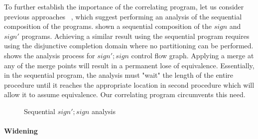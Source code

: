 To further establish the importance of the correlating program, let us consider previous approaches ~\cite{}, which suggest performing an analysis of the sequential composition of the programs.  shown a sequential composition of the $sign$ and $sign'$ programs. Achieving a similar result using the sequential program requires using the disjunctive completion domain where no partitioning can be performed.  shows the analysis process for $sign';sign$ control flow graph. Applying a merge at any of the merge points will result in a permanent lose of equivalence. Essentially, in the sequential program, the analysis must "wait" the length of the entire procedure until it reaches the appropriate location in second procedure which will allow it to assume equivalence. Our correlating program circumvents this need.



\begin{figure}
\caption{Sequential $sign';sign$ analysis}
\end{figure}


\paragraph{Widening}

